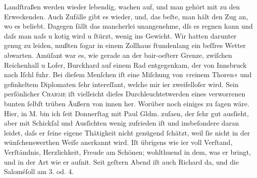 \begin{ledgroupsized}[t]{13cm}
                    Landſtraßen werden wieder lebendig, wachen auf, und man gehört mit zu den
                    Erweckenden. Auch Zufälle gibt es wieder, und, das beſte, man hält den Zug an,
                    wo es beliebt. {\pb}Dagegen fällt das mancherlei
                    unangenehme, dſs es regnen kann und daſs man naſs u kotig wird u ſtürzt, wenig
                    ins Gewicht. Wir hatten darunter genug zu leiden, mußten ſogar in einem Zollhaus
                    ſtundenlang ein beſſres Wetter abwarten. Amüſant war es, wie gerade an der bair-oeſterr
                    Grenze, zwiſchen Reichenhall u Lofer, Burckhard auf einem Rad entgegenkam, der von Innsbruck nach Iſchl
                    fuhr. Bei dieſem Menſchen iſt eine Miſchung von »reinem Thoren« und gefinkeltem
                    Diplomaten ſehr intereſſant, welche mir i{\geminationm}er
                    zweifelloſer {\pb}wird. Sein perſönlicher \textsc{Charme} iſt vielleicht dieſes Durchleuchtetwerden eines
                    verworrenen bunten ſelbſt trüben Äußern von innen her.\pend
           \pstart
           Worüber noch einiges zu ſagen wäre. Hier, in M. bin ich ſeit Donnerſtag mit Paul Gldm. zuſa{\geminationm}en, der ſehr
                    gut ausſieht, aber mit Schickſal und Ausſichten wenig zufrieden iſt und
                    insbeſondere daran leidet, daſs er ſeine eigene Thätigkeit nicht genügend
                    ſchätzt, weil ſie nicht in der wünſchenswerthen Weiſe anerkannt wird. Iſt
                    übrigens wie i{\geminationm}er voll Verſtand, Verſtändnis,
                    Herzlichkeit, Freude am Schönen; wohlthuend in dem, was er bringt, und in {\pb}der Art wie er aufni{\geminationm}t. Seit geſtern Abend iſt auch Richard da,
                    und die Saloméſoll am 3. od. 4.

\end{ledgroupsized}
